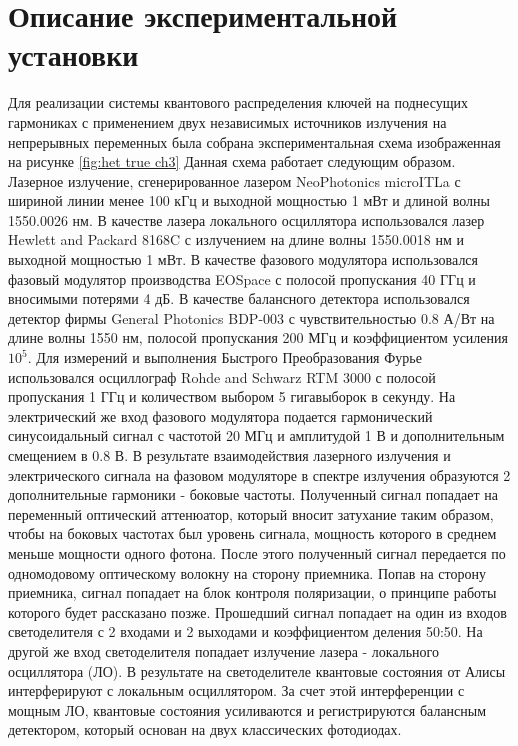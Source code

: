\section{Описание экспериментальной установки}\label{sec:ch3/sect7}
Для реализации системы квантового распределения ключей на поднесущих гармониках с применением двух независимых источников излучения на непрерывных переменных была собрана экспериментальная схема изображенная на рисунке \ref*{fig:het true ch3}
Данная схема работает следующим образом. Лазерное излучение, сгенерированное лазером NeoPhotonics microITLa с шириной линии менее 100 кГц и выходной мощностью 1 мВт и длиной волны 1550.0026 нм. В качестве лазера локального осциллятора использовался лазер Hewlett and Packard 8168C с излучением на длине волны 1550.0018 нм и выходной мощностью 1 мВт. В качестве фазового модулятора использовался фазовый модулятор производства EOSpace с полосой пропускания 40 ГГц и вносимыми потерями 4 дБ.
В качестве балансного детектора использовался детектор фирмы General Photonics BDP-003 с чувствительностью 0.8 А/Вт на длине волны 1550 нм, полосой пропускания 200 МГц и коэффициентом усиления ${10^5}$.
Для измерений и выполнения Быстрого Преобразования Фурье использовался осциллограф Rohde and Schwarz RTM 3000  с полосой пропускания 1 ГГц и количеством выбором 5 гигавыборок в секунду.
На электрический же вход фазового модулятора подается гармонический синусоидальный  сигнал с частотой 20 МГц и амплитудой 1 В и дополнительным смещением в 0.8 В. В результате взаимодействия лазерного излучения и электрического сигнала на фазовом модуляторе в спектре излучения образуются 2 дополнительные гармоники - боковые частоты.
Полученный сигнал попадает на переменный оптический аттенюатор, который вносит затухание таким образом, чтобы на боковых частотах был уровень сигнала, мощность которого в среднем меньше мощности одного фотона.
После этого полученный сигнал передается по одномодовому оптическому волокну на сторону приемника. Попав на сторону приемника, сигнал попадает на блок контроля поляризации, о принципе работы которого будет рассказано позже. Прошедший сигнал попадает на один из входов светоделителя с 2 входами и 2 выходами и коэффициентом деления 50:50.
На другой же вход светоделителя попадает излучение лазера - локального осциллятора (ЛО). В результате на светоделителе квантовые состояния от Алисы интерферируют с локальным осциллятором. За счет этой интерференции с мощным ЛО, квантовые состояния усиливаются и регистрируются балансным детектором, который основан на двух классических фотодиодах.

